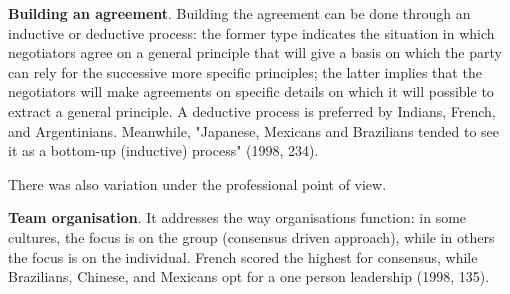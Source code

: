 \documentclass[../main.tex]{subfiles}
\begin{document}
\textbf{Building an agreement}. Building the agreement can be done through an inductive or deductive process: the former type indicates the situation in which negotiators agree on a general principle that will give a basis on which the party can rely for the successive more specific principles; the latter implies that the negotiators will make agreements on specific details on which it will possible to extract a general principle. A deductive process is preferred by Indians, French, and Argentinians. Meanwhile, "Japanese, Mexicans and Brazilians tended to see it as a bottom-up (inductive) process" (1998, 234).

\vspace{0.3cm}
\begin{minipage}{\linewidth}
    \label{buildingAgreementPerCountry}
\end{minipage}
\vspace{0.3cm}

There was also variation under the professional point of view.

\vspace{0.3cm}
\begin{minipage}{\linewidth}
    \label{buildingAgreementPerProfession}
\end{minipage}
\vspace{0.3cm}

\textbf{Team organisation}. It addresses the way organisations function: in some cultures, the focus is on the group (consensus driven approach), while in others the focus is on the individual. French scored the highest for consensus, while Brazilians, Chinese, and Mexicans opt for a one person leadership (1998, 135).

\vspace{0.3cm}
\begin{minipage}{\linewidth}
    \label{teamOrganisationPerCountry}
\end{minipage}
\vspace{0.3cm}
\end{document}
